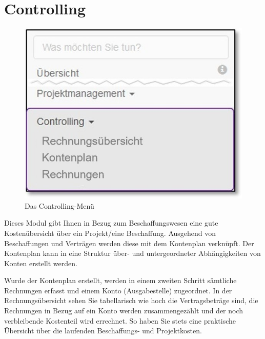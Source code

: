 
\clearpage
\section{Controlling}

\begin{figure}   %
  \vspace{-35pt}      %
  \begin{center}
    \includegraphics[width=1\linewidth]{../chapters/07_Controlling/pictures/contr_Uebersicht.jpg}
  \end{center}
  \vspace{-20pt}
  \caption{Das Controlling-Menü}
  \vspace{-10pt}
\end{figure}

Dieses Modul gibt Ihnen in Bezug zum Beschaffungswesen eine gute Kostenübersicht über ein Projekt/eine Beschaffung.
Ausgehend von Beschaffungen und Verträgen werden diese mit dem Kontenplan verknüpft. Der Kontenplan kann in eine Struktur über- und untergeordneter Abhängigkeiten von Konten erstellt werden.

\vspace{2cm} 

Wurde der Kontenplan erstellt, werden in einem zweiten Schritt sämtliche Rechnungen erfasst und einem Konto (Ausgabestelle) zugeordnet. In der Rechnungsübersicht sehen Sie tabellarisch wie hoch die Vertragsbeträge sind, die Rechnungen in Bezug auf ein Konto werden zusammengezählt und der noch verbleibende Kostenteil wird errechnet. So haben Sie stets eine praktische Übersicht über die laufenden Beschaffungs- und Projektkosten.


